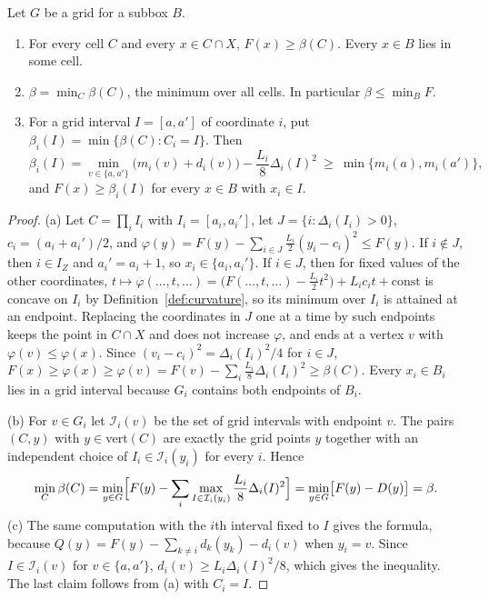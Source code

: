 \begin{proposition}\label{prop:cellwise}
Let $G$ be a grid for a subbox $B$.
\begin{enumerate}[label=(\alph*)]
\item For every cell $C$ and every $x\in C\cap X$, $F(x)\ge\beta(C)$. Every
$x\in B$ lies in some cell.
\item $\beta=\min_C\beta(C)$, the minimum over all cells. In particular
$\beta\le\min_BF$.
\item For a grid interval $I=[a,a']$ of coordinate $i$, put
$\beta_i(I)=\min\{\beta(C):C_i=I\}$. Then
\[
\beta_i(I)=\min_{v\in\{a,a'\}}\bigl(m_i(v)+d_i(v)\bigr)-\frac{L_i}8\Delta_i(I)^2
\ \ge\ \min\{m_i(a),m_i(a')\},
\]
and $F(x)\ge\beta_i(I)$ for every $x\in B$ with $x_i\in I$.
\end{enumerate}
\end{proposition}

\begin{proof}
(a) Let $C=\prod_iI_i$ with $I_i=[a_i,a_i']$, let $J=\{i:\Delta_i(I_i)>0\}$,
$c_i=(a_i+a_i')/2$, and
$\varphi(y)=F(y)-\sum_{i\in J}\frac{L_i}{2}(y_i-c_i)^2\le F(y)$. If $i\notin J$,
then $i\in I_Z$ and $a_i'=a_i+1$, so $x_i\in\{a_i,a_i'\}$. If $i\in J$, then
for fixed values of the other coordinates,
$t\mapsto\varphi(\dots,t,\dots)=\bigl(F(\dots,t,\dots)-\frac{L_i}2t^2\bigr)
+L_ic_it+\mathrm{const}$ is concave on $I_i$ by
Definition~\ref{def:curvature}, so its minimum over $I_i$ is attained at an
endpoint. Replacing the coordinates in $J$ one at a time by such endpoints
keeps the point in $C\cap X$ and does not increase $\varphi$, and ends at a
vertex $v$ with $\varphi(v)\le\varphi(x)$. Since $(v_i-c_i)^2=\Delta_i(I_i)^2/4$
for $i\in J$,
$F(x)\ge\varphi(x)\ge\varphi(v)=F(v)-\sum_i\frac{L_i}8\Delta_i(I_i)^2\ge\beta(C)$.
Every $x_i\in B_i$ lies in a grid interval because $G_i$ contains both endpoints
of $B_i$.

(b) For $v\in G_i$ let $\mathcal I_i(v)$ be the set of grid intervals with
endpoint $v$. The pairs $(C,y)$ with $y\in\mathrm{vert}(C)$ are exactly the
grid points $y$ together with an independent choice of $I_i\in\mathcal I_i(y_i)$
for every $i$. Hence
\[
\min_C\beta(C)=\min_{y\in G}\Bigl[F(y)-\sum_i\max_{I\in\mathcal I_i(y_i)}
\frac{L_i}8\Delta_i(I)^2\Bigr]=\min_{y\in G}\bigl[F(y)-D(y)\bigr]=\beta .
\]
(c) The same computation with the $i$th interval fixed to $I$ gives the
formula, because $Q(y)=F(y)-\sum_{k\ne i}d_k(y_k)-d_i(v)$ when $y_i=v$. Since
$I\in\mathcal I_i(v)$ for $v\in\{a,a'\}$, $d_i(v)\ge L_i\Delta_i(I)^2/8$, which
gives the inequality. The last claim follows from (a) with $C_i=I$.
\end{proof}


